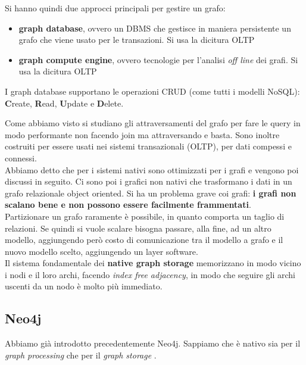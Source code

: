 Si hanno quindi due approcci principali per gestire un grafo:
\begin{itemize}
  \item \textbf{graph database}, ovvero un DBMS che gestisce in maniera persistente un grafo che viene usato per le transazioni. Si usa la dicitura OLTP
  \item \textbf{graph compute engine}, ovvero tecnologie per l'analisi \textit{off line} dei grafi. Si usa la dicitura OLTP
\end{itemize}

I graph database supportano le operazioni CRUD (come tutti i modelli NoSQL): \textbf{C}reate, \textbf{R}ead, \textbf{U}pdate e \textbf{D}elete.

Come abbiamo visto si studiano gli attraversamenti del grafo per fare le query in modo performante non facendo join ma attraversando e basta. Sono inoltre costruiti per essere usati nei sistemi transazionali (OLTP), per dati compessi e connessi. \\ 

Abbiamo detto che per i sistemi nativi sono ottimizzati per i grafi e vengono poi discussi in seguito. Ci sono poi i grafici non nativi che trasformano i dati in un grafo relazionale object oriented. 
Si ha un problema grave coi grafi: \textbf{i grafi non scalano bene e non possono essere facilmente frammentati}.\\ Partizionare un grafo raramente è possibile, in quanto comporta un taglio di relazioni. Se quindi si vuole scalare bisogna passare, alla fine, ad un altro modello, aggiungendo però costo di comunicazione tra il modello a grafo e il nuovo modello scelto, aggiungendo un layer software.\\

Il sistema fondamentale dei \textbf{native graph storage} memorizzano in modo vicino i nodi e il loro archi, facendo \textit{index free adjacency}, in modo che seguire gli archi uscenti da un nodo è molto più immediato.

\subsection{Neo4j}
Abbiamo già introdotto precedentemente Neo4j. Sappiamo che è nativo sia per il \textit{graph processing} che per il \textit{graph storage} .\\

